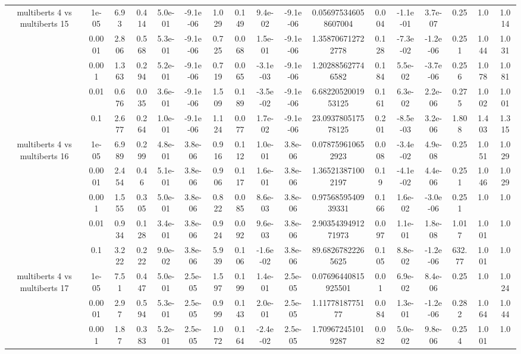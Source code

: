 \begin{tabular}{|c|c|c|c|c|c|c|c|c|c|c|c|c|c|c|c|c|}
\hline
\multirow{5}{*}{multiberts 4 vs multiberts 15} & 1e-05 & 6.93 & 0.414 & 5.0e-01 & -9.1e-06 & 1.029 & 0.149 & 9.4e-02 & -9.1e-06 & 0.056975346058607004 & 0.004 & -1.1e-01 & 3.7e-07 & 0.25 & 1.0 & 1.014 \\
 & 0.0001 & 2.806 & 0.568 & 5.3e-01 & -9.1e-06 & 0.725 & 0.068 & 1.5e-01 & -9.1e-06 & 1.358706712722778 & 0.128 & -7.3e-02 & -1.2e-06 & 0.251 & 1.044 & 1.031 \\
 & 0.001 & 1.363 & 0.294 & 5.2e-01 & -9.1e-06 & 0.719 & 0.065 & -3.1e-03 & -9.1e-06 & 1.202885627746582 & 0.184 & 5.5e-02 & -3.7e-06 & 0.256 & 1.078 & 1.081 \\
 & 0.01 & 0.676 & 0.035 & 3.6e-01 & -9.1e-06 & 1.509 & 0.189 & -3.5e-02 & -9.1e-06 & 6.6822052001953125 & 0.161 & 6.3e-02 & 2.2e-06 & 0.275 & 1.002 & 1.001 \\
 & 0.1 & 2.677 & 0.264 & 1.0e-01 & -9.1e-06 & 1.124 & 0.077 & 1.7e-02 & -9.1e-06 & 23.093780517578125 & 0.201 & -8.5e-03 & 3.2e-06 & 1.808 & 1.403 & 1.315 \\
\hline
\multirow{5}{*}{multiberts 4 vs multiberts 16} & 1e-05 & 6.989 & 0.299 & 4.8e-01 & 3.8e-06 & 0.916 & 0.112 & 1.0e-01 & 3.8e-06 & 0.078759610652923 & 0.008 & -3.4e-02 & 4.9e-08 & 0.25 & 1.051 & 1.029 \\
 & 0.0001 & 2.454 & 0.46 & 5.1e-01 & 3.8e-06 & 0.906 & 0.117 & 1.6e-01 & 3.8e-06 & 1.365213871002197 & 0.19 & -4.1e-02 & 4.4e-06 & 0.251 & 1.046 & 1.029 \\
 & 0.001 & 1.555 & 0.305 & 5.0e-01 & 3.8e-06 & 0.822 & 0.085 & 8.6e-03 & 3.8e-06 & 0.9756859540939331 & 0.166 & 1.6e-02 & -3.0e-06 & 0.251 & 1.0 & 1.0 \\
 & 0.01 & 0.934 & 0.128 & 3.4e-01 & 3.8e-06 & 0.924 & 0.092 & 9.6e-03 & 3.8e-06 & 2.9035439491271973 & 0.097 & 1.1e-01 & 1.8e-08 & 1.017 & 1.001 & 1.0 \\
 & 0.1 & 3.222 & 0.222 & 9.0e-02 & 3.8e-06 & 5.939 & 0.106 & -1.6e-02 & 3.8e-06 & 89.68267822265625 & 0.105 & 8.8e-02 & -1.2e-06 & 632.77 & 1.001 & 1.0 \\
\hline
\multirow{5}{*}{multiberts 4 vs multiberts 17} & 1e-05 & 7.51 & 0.447 & 5.0e-01 & 2.5e-05 & 1.597 & 0.199 & 1.4e-01 & 2.5e-05 & 0.07696440815925501 & 0.01 & 6.9e-02 & 8.4e-06 & 0.25 & 1.0 & 1.024 \\
 & 0.0001 & 2.97 & 0.594 & 5.3e-01 & 2.5e-05 & 0.999 & 0.143 & 2.0e-01 & 2.5e-05 & 1.1177818775177 & 0.084 & 1.3e-01 & -1.2e-06 & 0.282 & 1.064 & 1.044 \\
 & 0.001 & 1.87 & 0.383 & 5.2e-01 & 2.5e-05 & 1.072 & 0.164 & -2.4e-02 & 2.5e-05 & 1.709672451019287 & 0.082 & 5.0e-02 & 9.8e-06 & 0.254 & 1.001 & 1.0 \\

\end{tabular}
